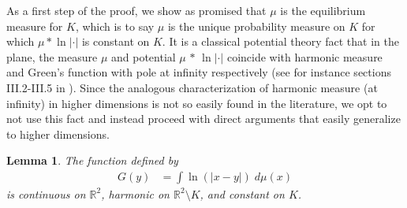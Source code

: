 \documentclass[10pt]{amsart}
\let\sm\setminus
\numberwithin{equation}{section}
\theoremstyle{plain}
\newtheorem{lem}{Lemma}[section]
\theoremstyle{definition}
\newcommand{\R}{\mathbb{R}}
\begin{document}
As a first step of the proof, we show as promised that $\mu$ is the equilibrium measure for $K$, which is to say $\mu$ is the unique probability measure on $K$ for which $\mu * \ln | \cdot |$ is constant on $K$. It is a classical potential theory fact that in the plane, the measure $\mu$ and potential $\mu \, * \, \ln | \cdot |$ coincide with harmonic measure and Green's function with pole at infinity respectively (see for instance sections III.2-III.5 in \cite{GM05}). Since the analogous characterization of harmonic measure (at infinity) in higher dimensions is not so easily found in the literature, we opt to not use this fact and instead proceed with direct arguments that easily generalize to higher dimensions.

	\begin{lem}\label{lg1}
	The function defined by
	\begin{align*}
	G(y) & = \int \ln(|x-y|) \; d\mu(x)
	\end{align*}
	is continuous on $\R^2$, harmonic on $\R^2 \sm K$, and constant on $K$.
	\end{lem}
\end{document}
